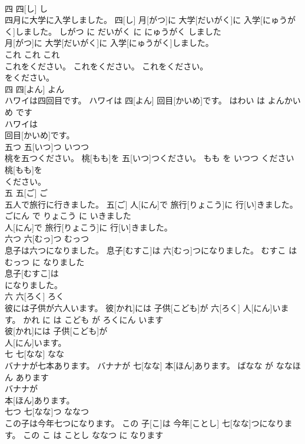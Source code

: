 \documentclass[8pt]{extreport}
\begin{document}
\begin{CJK}{UTF8}{min}
\\	四	四[し]	し	
\\	四月に大学に入学しました。	四[し] 月[がつ]に 大学[だいがく]に 入学[にゅうがく]しました。	しがつ に だいがく に にゅうがく しました	
\\	月[がつ]に 大学[だいがく]に 入学[にゅうがく]しました。			
\\	これ	これ	これ	
\\	これをください。	これをください。	これをください。	
\\	をください。			
\\	四	四[よん]	よん	
\\	ハワイは四回目です。	ハワイは 四[よん] 回目[かいめ]です。	はわい は よんかいめ です	
\\	ハワイは
\\	回目[かいめ]です。			
\\	五つ	五[いつ]つ	いつつ	
\\	桃を五つください。	桃[もも]を 五[いつ]つください。	もも を いつつ ください	
\\	桃[もも]を
\\	ください。			
\\	五	五[ご]	ご	
\\	五人で旅行に行きました。	五[ご] 人[にん]で 旅行[りょこう]に 行[い]きました。	ごにん で りょこう に いきました	
\\	人[にん]で 旅行[りょこう]に 行[い]きました。			
\\	六つ	六[むっ]つ	むっつ	
\\	息子は六つになりました。	息子[むすこ]は 六[むっ]つになりました。	むすこ は むっつ に なりました	
\\	息子[むすこ]は
\\	になりました。			
\\	六	六[ろく]	ろく	
\\	彼には子供が六人います。	彼[かれ]には 子供[こども]が 六[ろく] 人[にん]います。	かれ に は こども が ろくにん います	
\\	彼[かれ]には 子供[こども]が
\\	人[にん]います。			
\\	七	七[なな]	なな	
\\	バナナが七本あります。	バナナが 七[なな] 本[ほん]あります。	ばなな が ななほん あります	
\\	バナナが
\\	本[ほん]あります。			
\\	七つ	七[なな]つ	ななつ	
\\	この子は今年七つになります。	この 子[こ]は 今年[ことし] 七[なな]つになります。	この こ は ことし ななつ に なります	

\end{CJK}
\end{document}
